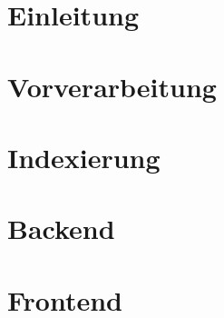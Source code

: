 




\pagestyle{empty} %



\pagestyle{useheadings} %
\setcounter{tocdepth}{3}    %
\setcounter{secnumdepth}{3} %

\tableofcontents %









\chapter{Einleitung}\label{ch:intro}


\chapter{Vorverarbeitung}\label{ch:prepros}


\chapter{Indexierung}\label{ch:indexing}


\chapter{Backend}\label{ch:backend}


\chapter{Frontend}\label{ch:frontend}


